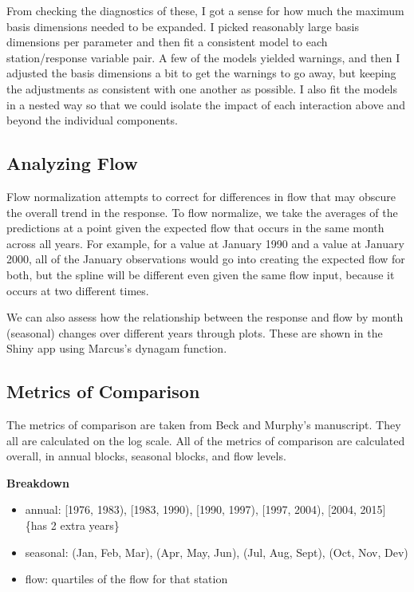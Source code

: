 \documentclass[12pt]{amsart}
\begin{document}
From checking the diagnostics of these, I got a sense for how much the maximum basis dimensions needed to be expanded. I picked reasonably large basis dimensions per parameter and then fit a consistent model to each station/response variable pair. A few of the models yielded warnings, and then I adjusted the basis dimensions a bit to get the warnings to go away, but keeping the adjustments as consistent with one another as possible. I also fit the models in a nested way so that we could isolate the impact of each interaction above and beyond the individual components. 

\subsection{Analyzing Flow }

Flow normalization attempts to correct for differences in flow that may obscure the overall trend in the response. To flow normalize, we take the averages of the predictions at a point given the expected flow that occurs in the same month across all years. For example, for a value at January 1990 and a value at January 2000, all of the January observations would go into creating the expected flow for both, but the spline will be different even given the same flow input, because it occurs at two different times.

We can also assess how the relationship between the response and flow by month (seasonal) changes over different years through plots. These are shown in the Shiny app using Marcus's dynagam function. 








\subsection{Metrics of Comparison}

The metrics of comparison are taken from Beck and Murphy's manuscript. They all are calculated on the log scale.  All of the metrics of comparison are calculated overall, in annual blocks, seasonal blocks, and flow levels. 

\textbf{Breakdown}
\begin{itemize}
\item annual: [1976, 1983), [1983, 1990), [1990, 1997), [1997, 2004), [2004, 2015] \{has 2 extra years\}
\item seasonal: (Jan, Feb, Mar), (Apr, May, Jun), (Jul, Aug, Sept), (Oct, Nov, Dev)
\item flow: quartiles of the flow for that station
\end{itemize}
\end{document}
